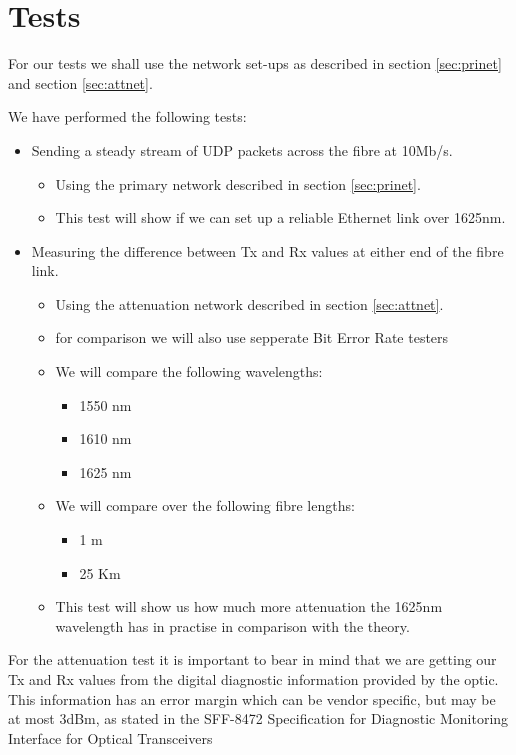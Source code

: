 \documentclass{article}
\begin{document}
\newpage
\section{Tests}
For our tests we shall use the network set-ups as described in section \ref{sec:prinet} and section \ref{sec:attnet}.

We have performed the following tests:
\begin{itemize}
\item Sending a steady stream of UDP packets across the fibre at 10Mb/s.
	\begin{itemize}
	\item Using the primary network described in section \ref{sec:prinet}.
	\item This test will show if we can set up a reliable Ethernet link over 1625nm.
	\end{itemize}
\item Measuring the difference between Tx and Rx values at either end of the fibre link.
	\begin{itemize}
	\item Using the attenuation network described in section \ref{sec:attnet}.
	\item for comparison we will also use sepperate Bit Error Rate testers
	\item We will compare the following wavelengths:
		\begin{itemize}
		\item 1550 nm
		\item 1610 nm
		\item 1625 nm
		\end{itemize}
	\item We will compare over the following fibre lengths:
		\begin{itemize}
		\item 1 m
		\item 25 Km
		\end{itemize}
	\item This test will show us how much more attenuation the 1625nm wavelength has in practise in comparison with the theory.
	\end{itemize}
\end{itemize}

For the attenuation test it is important to bear in mind that we are getting our Tx and Rx values from the digital diagnostic information provided by the optic.
This information has an error margin which can be vendor specific, but may be at most 3dBm, as stated in the SFF-8472 Specification for
Diagnostic Monitoring Interface for Optical Transceivers\cite{SFF:DDM}
\end{document}

